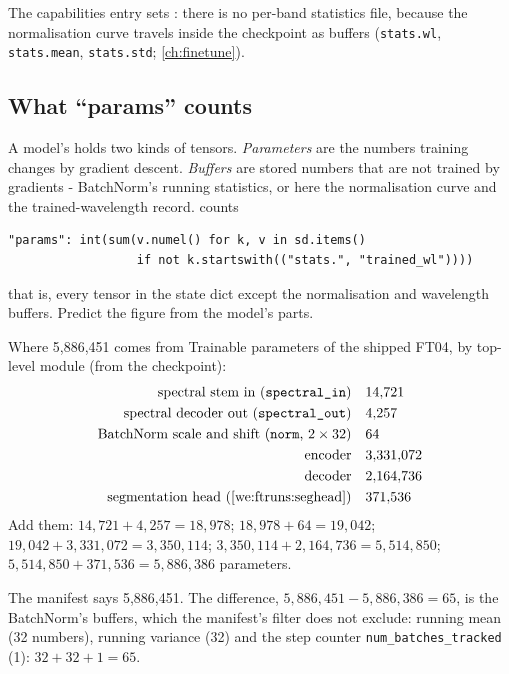 The capabilities entry sets : there is no per-band statistics file, because the
normalisation curve travels inside the checkpoint as buffers (\texttt{stats.wl}, \texttt{stats.mean},
\texttt{stats.std}; \cref{ch:finetune}).

\subsection{What ``params'' counts}

A model's  holds two kinds of tensors. \emph{Parameters} are the numbers training changes by gradient
descent. \emph{Buffers} are stored numbers that are not trained by gradients - BatchNorm's running statistics, or here
the normalisation curve and the trained-wavelength record.  counts
\begin{lstlisting}
"params": int(sum(v.numel() for k, v in sd.items()
                  if not k.startswith(("stats.", "trained_wl"))))
\end{lstlisting}
that is, every tensor in the state dict except the normalisation and wavelength buffers. Predict the figure from the
model's parts.

\begin{worked}[label={we:shipping:params}]{Where 5,886,451 comes from}
Trainable parameters of the shipped FT04, by top-level module (from the checkpoint\tagC):
\begin{align*}
\text{spectral stem in (\texttt{spectral\_in})} &\quad 14{,}721\\
\text{spectral decoder out (\texttt{spectral\_out})} &\quad 4{,}257\\
\text{BatchNorm scale and shift (\texttt{norm}, } 2 \times 32) &\quad 64\\
\text{encoder} &\quad 3{,}331{,}072\\
\text{decoder} &\quad 2{,}164{,}736\\
\text{segmentation head (\cref{we:ftruns:seghead})} &\quad 371{,}536
\end{align*}
Add them: $14{,}721 + 4{,}257 = 18{,}978$; $18{,}978 + 64 = 19{,}042$; $19{,}042 + 3{,}331{,}072 = 3{,}350{,}114$;
$3{,}350{,}114 + 2{,}164{,}736 = 5{,}514{,}850$; $5{,}514{,}850 + 371{,}536 = 5{,}886{,}386$ parameters.

The manifest says 5,886,451. The difference, $5{,}886{,}451 - 5{,}886{,}386 = 65$, is the BatchNorm's buffers, which the
manifest's filter does not exclude: running mean (32 numbers), running variance (32) and the step counter
\texttt{num\_batches\_tracked} (1): $32 + 32 + 1 = 65$.
\end{worked}

